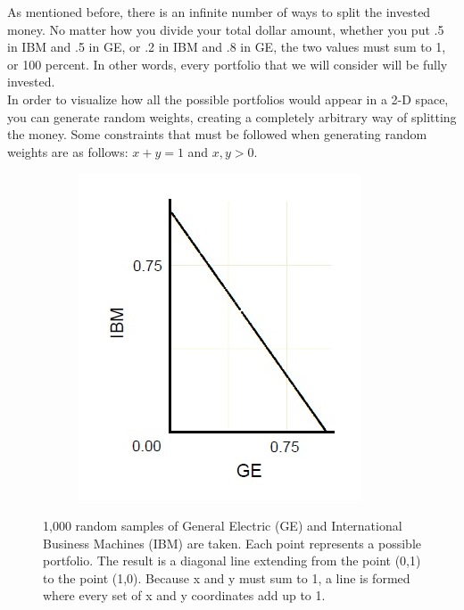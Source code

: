 \documentclass{article}\usepackage{graphicx, color}
\begin{document}
As mentioned before, there is an infinite number of ways to split the invested money. No matter how you divide your total dollar amount, whether you put .5 in IBM and .5 in GE, or .2 in IBM and .8 in GE, the two values must sum to 1, or 100 percent. In other words, every portfolio that we will consider will be fully invested.
\\
In order to visualize how all the possible portfolios would appear in a 2-D space, you can generate random weights, creating a completely arbitrary way of splitting the money. Some constraints that must be followed when generating random weights are as follows: $x + y = 1$ and ${x, y} > 0$.

\begin{figure}[H]
  \begin{subfigure}[b]{0.7\textwidth}
      \centering
      \includegraphics[width=\textwidth]{samples}
      \label{fig:samples}
  \end{subfigure}
\caption{1,000 random samples of General Electric (GE) and International Business Machines (IBM) are taken. Each point represents a possible portfolio. The result is a diagonal line extending from the point (0,1) to the point (1,0). Because x and y must sum to 1, a line is formed where every set of x and y coordinates add up to 1.}
\end{figure}
\end{document}

